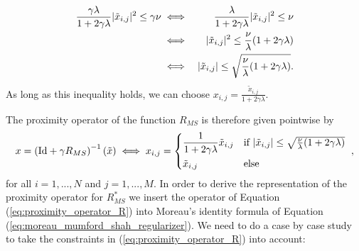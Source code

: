 \documentclass[abstracton]{scrreprt}
\begin{document}
\begin{enumerate}
                        \begin{eqnarray}
                            \frac{\gamma\lambda}{1 + 2\gamma\lambda} |\tilde{x}_{i,j}|^{2} \le \gamma \nu &\iff& \frac{\lambda}{1 + 2\gamma\lambda} |\tilde{x}_{i,j}|^{2} \le \nu \label{eq:minimal_energy} \\
                            &\iff& |\tilde{x}_{i,j}|^{2} \le \frac{\nu}{\lambda}(1 + 2\gamma\lambda) \notag \\
                            &\iff& |\tilde{x}_{i,j}| \le \sqrt{\frac{\nu}{\lambda}(1 + 2\gamma\lambda)}. \notag
                        \end{eqnarray}
                    As long as this inequality holds, we can choose $x_{i,j} = \frac{\tilde{x}_{i,j}}{1 + 2 \gamma \lambda}$.
                \end{enumerate}
            The proximity operator of the function $R_{MS}$ is therefore given pointwise by
                \begin{equation}
                    x = \left( \textnormal{Id} + \gamma R_{MS} \right)^{-1}(\tilde{x}) \iff x_{i,j} =
                    \begin{dcases*}
                        \frac{1}{1 + 2\gamma\lambda}\tilde{x}_{i,j} & \textnormal{if $|\tilde{x}_{i,j}| \le \sqrt{\frac{\nu}{\lambda}(1 + 2\gamma\lambda)}$} \\
                        \tilde{x}_{i,j} & \textnormal{else}
                    \end{dcases*},
                    \label{eq:proximity_operator_R}
                \end{equation}
            for all $i = 1, ..., N$ and $j = 1, ..., M$. In order to derive the representation of the proximity operator for $R_{MS}^{\ast}$ we insert the operator of Equation (\ref{eq:proximity_operator_R}) into Moreau's identity formula of Equation (\ref{eq:moreau_mumford_shah_regularizer}). We need to do a case by case study to take the constraints in (\ref{eq:proximity_operator_R}) into account:
\end{document}
